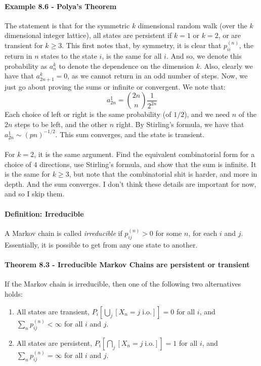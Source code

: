 \documentclass[12pt,a4paper]{article}
\newcommand{\1}[1]{\mathbbm{1}\left\{ #1 \right\}}
\newcommand{\io}{\text{i.o.}}
\begin{document}
\paragraph{Example 8.6 - Polya's Theorem} The statement is that for the symmetric $k$ dimensional random walk (over the $k$ dimensional integer lattice), all states are persistent if $k = 1$ or $k = 2$, or are transient for $k \geq 3$. This first notes that, by symmetry, it is clear that $p_{ii}^{(n)}$, the return in $n$ states to the state $i$, is the same for all $i$. And so, we denote this probability as $a_n^k$ to denote the dependence on the dimension $k$. Also, clearly we have that $a_{2n + 1}^k = 0$, as we cannot return in an odd number of steps. Now, we just go about proving the sums or infinite or convergent.  We note that:
$$
	a_{2n}^1 = {2n \choose n} \frac{1}{2^{2n}}
$$
Each choice of left or right is the same probability (of $1/2$), and we need $n$ of the $2n$ steps to be left, and the other $n$ right. By Stirling's formula, we have that $a_{2n}^1 \sim (pn)^{-1/2}$. This sum converges, and the state is transient.
\\\\
For $k = 2$, it is the same argument. Find the equivalent combinatorial form for a choice of $4$ directions, use Stirling's formula, and show that the sum is infinite. It is the same for $k \geq 3$, but note that the combinatorial shit is harder, and more in depth. And the sum converges. I don't think these details are important for now, and so I skip them.

\paragraph{Definition: Irreducible} A Markov chain is called \textit{irreducible} if $p_{ij}^{(n)} > 0$ for some $n$, for each $i$ and $j$. Essentially, it is possible to get from any one state to another.

\paragraph{Theorem 8.3 - Irreducible Markov Chains are persistent or transient} If the Markov chain is irreducible, then one of the following two alternatives holds:
\begin{enumerate}
	\item All states are transient, $P_i\left[\bigcup_j [X_n = j \; \io]\right] = 0$ for all $i$, and $\sum_n p_{ij}^{(n)} < \infty$ for all $i$ and $j$.
	
	\item All states are persistent, $P_i\left[\bigcap_j [X_n = j \; \io]\right] = 1$ for all $i$, and $\sum_n p_{ij}^{(n)} = \infty$ for all $i$ and $j$. 
\end{enumerate}
\end{document}
